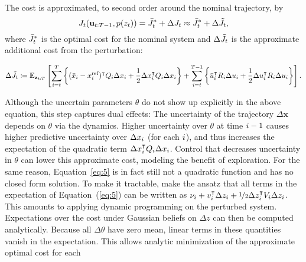 The cost is approximated,
to second order around the nominal trajectory, by
\begin{equation}
    J_t(\mathbf{u}_{t:T-1}, p(z_t)) = \bar J_t^* + \Delta J_t
    \approx \bar J_t^* + \Delta \tilde J_t,
\end{equation}
where $\bar J^*_t$ is the optimal cost for the nominal system and
$\Delta\tilde{J}_t$ is the approximate additional cost from the perturbation:
\begin{fullwidth}\vspace{-\baselineskip}
\begin{equation}
  \label{eq:5}
    \Delta \tilde J_\tk \ce \Exp_{\mathbf{z}_{\tk:T}}\left[ \sum_{\i=\tk}^{T}
\left\{ (\bar{x}_\i - \xref_\i)\T \SC_\i \dx_\i + \frac{1}{2}\dx_\i\T \SC_\i
\dx_\i
    \right\} + \sum_{\i=\tk}^{T-1} \left\{ \bar{u}_\i\T
      \CC_\i \du_\i + \frac{1}{2}\du_\i\T \CC_\i \du_\i\right\}\right].
\end{equation}
\end{fullwidth}
Although the uncertain parameters $\theta$ do not show up explicitly in the
above equation, this step captures dual effects: The uncertainty of the
trajectory $\Delta \mathbf{x}$ depends on $\theta$ via the dynamics. Higher
uncertainty over $\theta$ at time $i-1$ causes higher predictive uncertainty
over $\Delta x_i$ (for each $i$), and thus increases the expectation of the
quadratic term $\Delta x_i^{\intercal} Q_i \Delta x_i$. Control that decreases
uncertainty in $\theta$ can lower this approximate cost, modeling the benefit of
exploration. For the same reason, Equation~\eqref{eq:5} is in fact still not a
quadratic function and has no closed form solution. To make it tractable,
\textcite{Tse.Bar-Shalom:1973:Actively} make the ansatz that all terms in the
expectation of Equation~(\ref{eq:5}) can be written as $\nu_i + v_i^{\intercal} \Delta
z_i + \nicefrac{1}{2}\Delta z_i^{\intercal} V_i \Delta z_i$. This amounts to
applying dynamic programming on the perturbed system. Expectations over the cost
under Gaussian beliefs on $\Delta z$ can then be computed analytically. Because
all $\Delta\theta$ have zero mean, linear terms in these quantities vanish in
the expectation.
This allows analytic minimization of the approximate optimal cost for each
